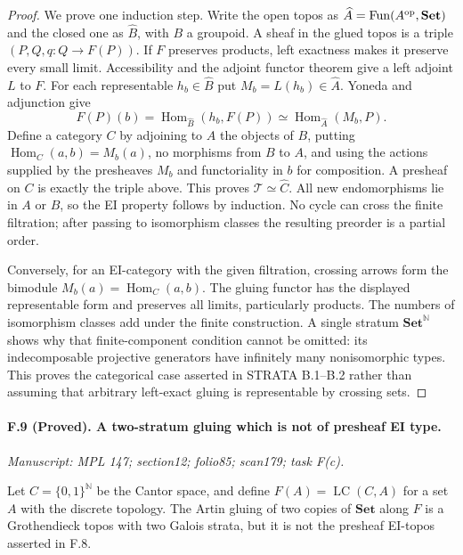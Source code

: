 \begin{proof}
We prove one induction step. Write the open topos as
$\widehat A=\operatorname{Fun}(A^{\rm op},\mathbf{Set})$ and the closed
one as $\widehat B$, with $B$ a groupoid. A sheaf in the glued topos is a
triple $(P,Q,q:Q\to F(P))$. If $F$ preserves products, left exactness
makes it preserve every small limit. Accessibility and the adjoint
functor theorem give a left adjoint $L$ to $F$. For each representable
$h_b\in\widehat B$ put $M_b=L(h_b)\in\widehat A$. Yoneda and adjunction
give
\[
 F(P)(b)=\operatorname{Hom}_{\widehat B}(h_b,F(P))
          \simeq\operatorname{Hom}_{\widehat A}(M_b,P).
\]
Define a category $C$ by adjoining to $A$ the objects of $B$, putting
$\operatorname{Hom}_C(a,b)=M_b(a)$, no morphisms from $B$ to $A$, and
using the actions supplied by the presheaves $M_b$ and functoriality in
$b$ for composition. A presheaf on $C$ is exactly the triple above.
This proves $\mathcal T\simeq\widehat C$. All new endomorphisms lie in
$A$ or $B$, so the EI property follows by induction. No cycle can cross
the finite filtration; after passing to isomorphism classes the resulting
preorder is a partial order.

Conversely, for an EI-category with the given filtration, crossing arrows
form the bimodule $M_b(a)=\operatorname{Hom}_C(a,b)$. The gluing functor
has the displayed representable form and preserves all limits,
particularly products. The numbers of isomorphism classes add under the
finite construction. A single stratum $\mathbf{Set}^{\mathbb N}$ shows
why that finite-component condition cannot be omitted: its indecomposable
projective generators have infinitely many nonisomorphic types.
This proves the categorical case asserted in STRATA B.1--B.2 rather than
assuming that arbitrary left-exact gluing is representable by crossing
sets.
\end{proof}

\paragraph{F.9 (Proved). A two-stratum gluing which is not of presheaf EI type.}
\textit{Manuscript: MPL 147; section12; folio85; scan179; task F(c).}

Let $C=\{0,1\}^{\mathbb N}$ be the Cantor space, and define
$F(A)=\operatorname{LC}(C,A)$ for a set $A$ with the discrete topology.
The Artin gluing of two copies of $\mathbf{Set}$ along $F$ is a
Grothendieck topos with two Galois strata, but it is not the presheaf
EI-topos asserted in F.8.

